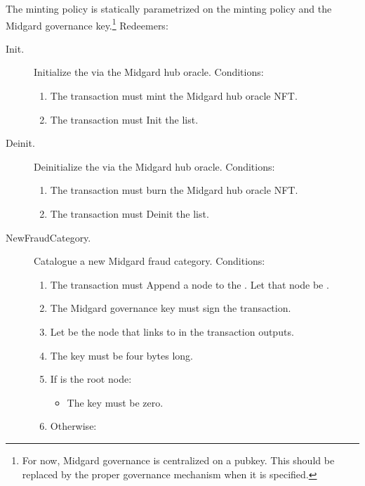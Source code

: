 \documentclass[../midgard.tex]{subfiles}
\begin{document}
The  minting policy is statically parametrized on the  minting policy and the Midgard governance key.\footnote{For now, Midgard governance is centralized on a pubkey.
This should be replaced by the proper governance mechanism when it is specified.} Redeemers:
\begin{description}
    \item[Init.] Initialize the  via the Midgard hub oracle.
      Conditions:
        \begin{enumerate}
            \item The transaction must mint the Midgard hub oracle NFT.
            \item The transaction must Init the  list.
        \end{enumerate}
    \item[Deinit.] Deinitialize the  via the Midgard hub oracle.
      Conditions:
        \begin{enumerate}
            \item The transaction must burn the Midgard hub oracle NFT.
            \item The transaction must Deinit the  list.
        \end{enumerate}
    \item[NewFraudCategory.] Catalogue a new Midgard fraud category.
      Conditions:
        \begin{enumerate}
            \item The transaction must Append a node to the .
              Let that node be .
            \item The Midgard governance key must sign the transaction.
            \item Let  be the node that links to  in the transaction outputs.
            \item The  key must be four bytes long.
            \item If  is the root node:
                \begin{itemize}
                    \item The  key must be zero.
                \end{itemize}
            \item Otherwise:
                \begin{itemize}

\end{itemize}
\end{enumerate}
\end{description}
\end{document}
